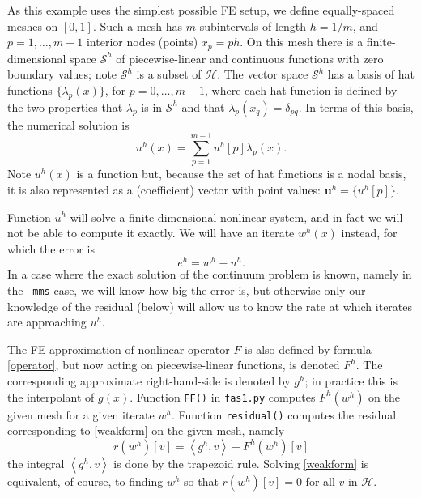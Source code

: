 \documentclass[letterpaper,final,12pt,reqno]{amsart}
\newcommand{\bu}{\mathbf{u}}
\newcommand{\ip}[2]{\left<#1,#2\right>}
\begin{document}
As this example uses the simplest possible FE setup, we define equally-spaced meshes on $[0,1]$.  Such a mesh has $m$ subintervals of length $h=1/m$, and $p=1,\dots,m-1$ interior nodes (points) $x_p=ph$.  On this mesh there is a finite-dimensional space $\mathcal{S}^h$ of piecewise-linear and continuous functions with zero boundary values; note $\mathcal{S}^h$ is a subset of $\mathcal{H}$.  The vector space $\mathcal{S}^h$ has a basis of hat functions $\{\lambda_p(x)\}$, for $p=0,\dots,m-1$, where each hat function is defined by the two properties that $\lambda_p$ is in $\mathcal{S}^h$ and that $\lambda_p(x_q)=\delta_{pq}$.  In terms of this basis, the numerical solution is
\begin{equation}
  u^h(x) = \sum_{p=1}^{m-1} u^h[p] \lambda_p(x).  \label{fesolution}
\end{equation}
Note $u^h(x)$ is a function but, because the set of hat functions is a nodal basis, it is also represented as a (coefficient) vector with point values: $\bu^h =\{u^h[p]\}$.

Function $u^h$ will solve a finite-dimensional nonlinear system, and in fact we will not be able to compute it exactly.  We will have an iterate $w^h(x)$ instead, for which the error is
\begin{equation}
  e^h = w^h - u^h.  \label{error}
\end{equation}
In a case where the exact solution of the continuum problem is known, namely in the \texttt{-mms} case, we will know how big the error is, but otherwise only our knowledge of the residual (below) will allow us to know the rate at which iterates are approaching $u^h$.

The FE approximation of nonlinear operator $F$ is also defined by formula \eqref{operator}, but now acting on piecewise-linear functions, is denoted $F^h$.  The corresponding approximate right-hand-side is denoted by $g^h$; in practice this is the interpolant of $g(x)$.  Function \texttt{FF()} in \texttt{fas1.py} computes $F^h(w^h)$ on the given mesh for a given iterate $w^h$.  Function \texttt{residual()} computes the residual corresponding to \eqref{weakform} on the given mesh, namely
\begin{equation}
  r(w^h)[v] = \ip{g^h}{v} - F^h(w^h)[v]  \label{residual}
\end{equation}
the integral $\ip{g^h}{v}$ is done by the trapezoid rule.  Solving \eqref{weakform} is equivalent, of course, to finding $w^h$ so that $r(w^h)[v]=0$ for all $v$ in $\mathcal{H}$.
\end{document}
